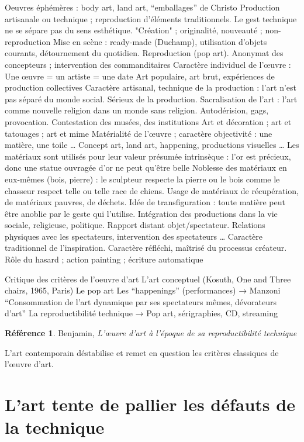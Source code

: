 \documentclass[french]{book}
\theoremstyle{definition}
\newtheorem*{refe}{Référence}
\begin{document}
Oeuvres éphémères : body art, land art, “emballages” de Christo
Production artisanale ou technique ; reproduction d'éléments traditionnels. Le gest technique ne se sépare pas du sens esthétique.
"Création" ; originalité, nouveauté ; non-reproduction
Mise en scène : ready-made (Duchamp), utilisation d’objets courants, détournement du quotidien. Reproduction (pop art).
Anonymat des concepteurs ; intervention des commanditaires
Caractère individuel de l'œuvre :
Une œuvre = un artiste = une date
Art populaire, art brut, expériences de production collectives
Caractère artisanal, technique de la production : l'art n'est pas séparé du monde social.
Sérieux de la production. Sacralisation de l'art : l'art comme nouvelle religion dans un monde sans religion.
Autodérision, gags, provocation. Contestation des musées, des institutions
Art et décoration ; art et tatouages ; art et mime 
Matérialité de l'œuvre ; caractère objectivité : une matière, une toile …
Concept art, land art, happening, productions visuelles …
Les matériaux sont utilisés pour leur valeur présumée intrinsèque : l'or est précieux, donc une statue ouvragée d'or ne peut qu'être belle
Noblesse des matériaux en eux-mêmes (bois, pierre) : le sculpteur respecte la pierre ou le bois comme le chasseur respect telle ou telle race de chiens.
Usage de matériaux de récupération, de matériaux pauvres, de déchets. Idée de transfiguration : toute matière peut être anoblie par le geste qui l’utilise.
Intégration des productions dans la vie sociale, religieuse, politique.
Rapport distant objet/spectateur.
Relations physiques avec les spectateurs, intervention des spectateurs …
Caractère traditionnel de l'inspiration.
Caractère réfléchi, maîtrisé du processus créateur.
Rôle du hasard ; action painting ; écriture automatique


Critique des critères de l’oeuvre d’art 
L’art conceptuel (Kosuth, One and Three chairs, 1965, Paris)
Le pop art
Les “happenings” (performances) → Manzoni “Consommation de l’art dynamique par ses spectateurs mêmes, dévorateurs d’art”
La reproductibilité technique → Pop art, sérigraphies, CD, streaming
\begin{refe}
	Benjamin, \textit{L’œuvre d’art à l’époque de sa reproductibilité technique}
\end{refe}

L’art contemporain déstabilise et remet en question les critères classiques de l'œuvre d’art.

\section{L’art tente de pallier les défauts de la technique}
\end{document}
